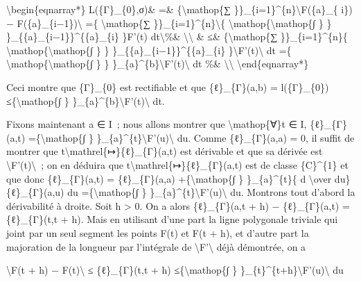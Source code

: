 \documentclass[]{article}
\begin{document}
\textbackslash{}begin\{eqnarray*\} L(\{Γ\}\_\{0\},σ)\& =\&
\{\textbackslash{}mathop\{∑
\}\}\_\{i=1\}\^{}\{n\}\textbackslash{}\textbar{}F(\{a\}\_\{ i\}) −
F(\{a\}\_\{i−1\})\textbackslash{}\textbar{} =\{
\textbackslash{}mathop\{∑
\}\}\_\{i=1\}\^{}\{n\}\textbackslash{}\textbar{}\{
\textbackslash{}mathop\{\textbackslash{}mathop\{∫ \} \}
\}\_\{\{a\}\_\{i−1\}\}\^{}\{\{a\}\_\{i\} \}F'(t)
dt\textbackslash{}\textbar{}\%\& \textbackslash{}\textbackslash{} \& ≤\&
\{\textbackslash{}mathop\{∑ \}\}\_\{i=1\}\^{}\{n\}\{
\textbackslash{}mathop\{\textbackslash{}mathop\{∫ \} \}
\}\_\{\{a\}\_\{i−1\}\}\^{}\{\{a\}\_\{i\}
\}\textbackslash{}\textbar{}F'(t)\textbackslash{}\textbar{} dt =\{
\textbackslash{}mathop\{\textbackslash{}mathop\{∫ \} \}
\}\_\{a\}\^{}\{b\}\textbackslash{}\textbar{}F'(t)\textbackslash{}\textbar{}
dt \%\& \textbackslash{}\textbackslash{}
\textbackslash{}end\{eqnarray*\}

Ceci montre que \{Γ\}\_\{0\} est rectifiable et que \{ℓ\}\_\{Γ\}(a,b) =
l(\{Γ\}\_\{0\}) ≤\{\textbackslash{}mathop\{∫ \}
\}\_\{a\}\^{}\{b\}\textbackslash{}\textbar{}F'(t)\textbackslash{}\textbar{}
dt.

Fixons maintenant a ∈ I~; nous allons montrer que
\textbackslash{}mathop\{∀\}t ∈ I, \{ℓ\}\_\{Γ\}(a,t)
=\{\textbackslash{}mathop\{∫ \}
\}\_\{a\}\^{}\{t\}\textbackslash{}\textbar{}F'(u)\textbackslash{}\textbar{}
du. Comme \{ℓ\}\_\{Γ\}(a,a) = 0, il suffit de montrer que
t\textbackslash{}mathrel\{↦\}\{ℓ\}\_\{Γ\}(a,t) est dérivable et que sa
dérivée est \textbackslash{}\textbar{}F'(t)\textbackslash{}\textbar{}~;
on en déduira que t\textbackslash{}mathrel\{↦\}\{ℓ\}\_\{Γ\}(a,t) est de
classe \{C\}\^{}\{1\} et que donc \{ℓ\}\_\{Γ\}(a,t) = \{ℓ\}\_\{Γ\}(a,a)
+\{\textbackslash{}mathop\{∫ \} \}\_\{a\}\^{}\{t\}\{ d
\textbackslash{}over du\} \{ℓ\}\_\{Γ\}(a,u) du
=\{\textbackslash{}mathop\{∫ \}
\}\_\{a\}\^{}\{t\}\textbackslash{}\textbar{}F'(u)\textbackslash{}\textbar{}
du. Montrons tout d'abord la dérivabilité à droite. Soit h
\textgreater{} 0. On a alors \{ℓ\}\_\{Γ\}(a,t + h) − \{ℓ\}\_\{Γ\}(a,t) =
\{ℓ\}\_\{Γ\}(t,t + h). Mais en utilisant d'une part la ligne polygonale
triviale qui joint par un seul segment les points F(t) et F(t + h), et
d'autre part la majoration de la longueur par l'intégrale de
\textbackslash{}\textbar{}F'\textbackslash{}\textbar{} déjà démontrée,
on a

\textbackslash{}\textbar{}F(t + h) − F(t)\textbackslash{}\textbar{} ≤
\{ℓ\}\_\{Γ\}(t,t + h) ≤\{\textbackslash{}mathop\{∫ \}
\}\_\{t\}\^{}\{t+h\}\textbackslash{}\textbar{}F'(u)\textbackslash{}\textbar{}
du
\end{document}
